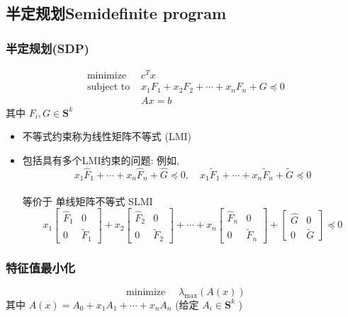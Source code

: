 \documentclass[handout]{beamer}
\begin{document}
\begin{frame}
	\subsection{半定规划Semidefinite program}
	\begin{frame}
		\frametitle{半定规划(SDP)}
		\begin{equation}
			\begin{array}{ll}
				\text { minimize } & c^{T} x \\
				\text { subject to } & x_{1} F_{1}+x_{2} F_{2}+\cdots+x_{n} F_{n}+G \preceq 0 \\
				& A x=b
			\end{array}
		\end{equation}
		其中 $F_{i}, G \in \mathbf{S}^{k}$\\
		\begin{itemize}[<+->]
			\item 不等式约束称为线性矩阵不等式 (LMI)
			\item 包括具有多个LMI约束的问题: 例如,
			\begin{equation}
				x_{1} \hat{F}_{1}+\cdots+x_{n} \hat{F}_{n}+\hat{G} \preceq 0, \quad x_{1} \tilde{F}_{1}+\cdots+x_{n} \tilde{F}_{n}+\tilde{G} \preceq 0
			\end{equation}\\
			等价于 单线矩阵不等式 SLMI
			\begin{equation}
				x_{1}\left[\begin{array}{cc}
					\hat{F}_{1} & 0 \\
					0 & \tilde{F}_{1}
				\end{array}\right]+x_{2}\left[\begin{array}{cc}
					\hat{F}_{2} & 0 \\
					0 & \tilde{F}_{2}
				\end{array}\right]+\cdots+x_{n}\left[\begin{array}{cc}
					\hat{F}_{n} & 0 \\
					0 & \tilde{F}_{n}
				\end{array}\right]+\left[\begin{array}{cc}
					\hat{G} & 0 \\
					0 & \tilde{G}
				\end{array}\right] \preceq 0
			\end{equation}
		\end{itemize}
	\end{frame}
	\begin{frame}
		\frametitle{特征值最小化}
		\begin{equation}
			\text { minimize } \quad \lambda_{\max }(A(x))
		\end{equation}
		其中 $A(x)=A_{0}+x_{1} A_{1}+\cdots+x_{n} A_{n}$ (给定 $A_{i} \in \mathbf{S}^{k}$ )\\
		

\end{frame}
\end{frame}
\end{document}
